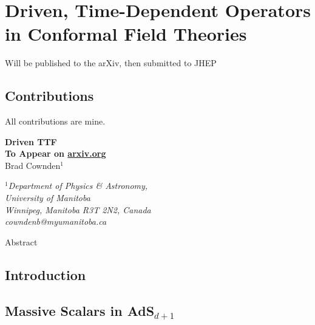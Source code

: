 \documentclass[../PhD.tex]{subfiles}
\begin{document}

\chapter{Driven, Time-Dependent Operators in Conformal Field Theories}

Will be published to the arXiv, then submitted to JHEP


\section{Contributions}

All contributions are mine.

\newpage


\begin{center}
{\bf{\Large Driven TTF}} \\
\bigskip
{\bf To Appear on \href{https://arxiv.org}{arxiv.org}} \\
\bigskip
\bigskip
Brad Cownden$^1$\\
\bigskip

$^1${\it Department of Physics \& Astronomy,\\ University of Manitoba\\
Winnipeg, Manitoba R3T 2N2, Canada \\ {\rm cowndenb@myumanitoba.ca}} \\

\end{center}

\bigskip

Abstract


\section{Introduction}


\section{Massive Scalars in AdS$_{d+1}$}


\end{document}
